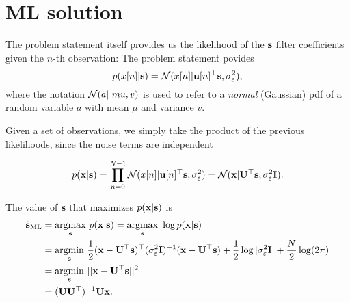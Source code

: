 

\section{ML solution}

The problem statement itself provides us the likelihood of the ${\mathbf s}$ filter coefficients given the $n$-th observation:
The problem statement povides
\begin{equation}
p(x[n] | {\mathbf s} ) = {\mathcal N}(x[n]| {\mathbf u}[n]^\top{\mathbf s}, \sigma_\varepsilon^2),
\end{equation}
%
where the notation ${\mathcal N}(a | \ mu, v) $ is used to refer to a \emph{normal} (Gaussian) pdf of a random variable $a$ with mean $\mu$ and variance $v$.

Given a set of observations, we simply take the product of the previous likelihoods, since the noise terms are independent

\begin{equation}
p({\mathbf x} | {\mathbf s}) = \prod_{n=0}^{N-1} {\mathcal N}(x[n]| {\mathbf u}[n]^\top{\mathbf s}, \sigma_\varepsilon^2) = {\mathcal N}({\mathbf x}| {\mathbf U}^\top{\mathbf s}, \sigma_\varepsilon^2{\mathbf I}).
\end{equation}

The value of ${\mathbf s}$ that maximizes $p({\mathbf x} | {\mathbf s})$ is
\begin{align}
\hat{{\mathbf s}}_\text{ML} 
   &= \underset{{\mathbf s}}{\operatorname{argmax}}~ p( {\mathbf x} | {\mathbf s} ) 
    = \underset{{\mathbf s}}{\operatorname{argmax}}~ \log p( {\mathbf x} | {\mathbf s} ) \nonumber \\
   &= \underset{{\mathbf s}}{\operatorname{argmin}}~ \frac{1}{2} ({\mathbf x} - {\mathbf U}^\top{\mathbf s})^\top(\sigma_\varepsilon^2{\mathbf I})^{-1}
                              ({\mathbf x} - {\mathbf U}^\top{\mathbf s}) 
                + \frac{1}{2} \log|\sigma_\varepsilon^2{\mathbf I}|+\frac{N}{2}\log(2\pi) 
                \nonumber \\
   &= \underset{{\mathbf s}}{\operatorname{argmin}}~ ||{\mathbf x} - {\mathbf U}^\top{\mathbf s}||^2\\
   &= ({\mathbf U} {\mathbf U}^\top)^{-1} {\mathbf U}{\mathbf x}.
\label{sml}
\end{align}

